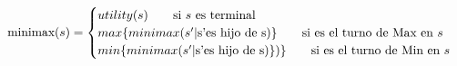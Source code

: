 \documentclass[preview]{standalone}
\begin{document}
\begin{align*}
\text{minimax($s$)} =  \begin{cases}
                                 utility(s) \qquad \text{si $s$ es terminal} \cr
                                 max\{minimax(\text{$s'$}| $s'$ \text{es hijo de }$s$)\}\qquad \text{si es el turno de Max en $s$} \cr
                                 min\{minimax(\text{$s'$}| $s'$ \text{es hijo de }$s$)\})\}\qquad \text{si es el turno de Min en $s$} \cr
                                 \end{cases}
\end{align*}
\end{document}
